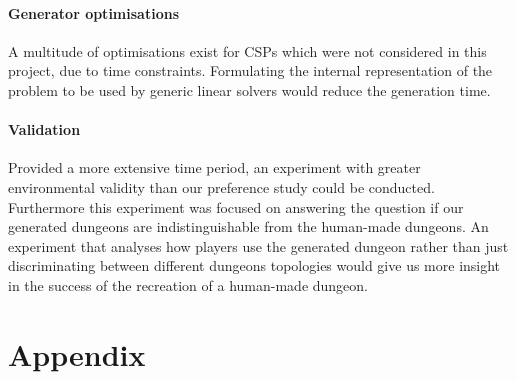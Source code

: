\documentclass{UoYCSproject}
\begin{document}
\subsubsection{Generator optimisations}
A multitude of optimisations exist for CSPs which were not considered in this project, due to time constraints. Formulating the internal representation of the problem to be used by generic linear solvers would reduce the generation time.

\subsubsection{Validation}
Provided a more extensive time period, an experiment with greater environmental validity than our preference study could be conducted.
Furthermore this experiment was focused on answering the question if our generated dungeons are indistinguishable from the human-made dungeons. An experiment that analyses how players use the generated dungeon rather than just discriminating between different dungeons topologies would give us more insight in the success of the recreation of a human-made dungeon.

\appendix
\chapter{Appendix}
\label{cha:aA}
\end{document}
